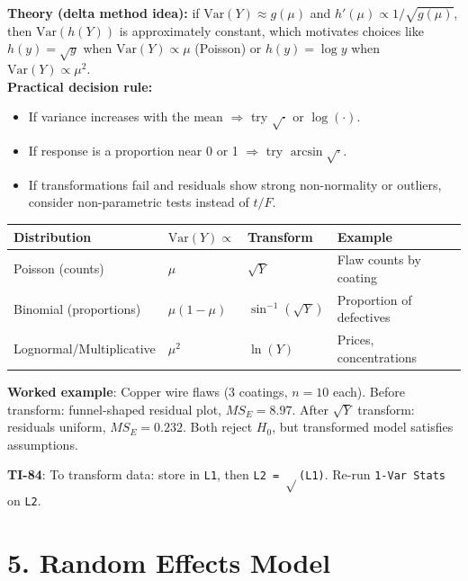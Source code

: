 \documentclass[9pt,letterpaper]{article}
\begin{document}
\textbf{Theory (delta method idea):} if $\mathrm{Var}(Y)\approx g(\mu)$ and $h'(\mu)\propto 1/\sqrt{g(\mu)}$, then $\mathrm{Var}(h(Y))$ is approximately constant, which motivates choices like $h(y)=\sqrt{y}$ when $\mathrm{Var}(Y)\propto\mu$ (Poisson) or $h(y)=\log y$ when $\mathrm{Var}(Y)\propto\mu^2$.\\[2pt]
\textbf{Practical decision rule:}
\begin{itemize}
  \item If variance increases with the mean $\Rightarrow$ try $\sqrt{\cdot}$ or $\log(\cdot)$.
  \item If response is a proportion near 0 or 1 $\Rightarrow$ try $\arcsin\sqrt{\cdot}$.
  \item If transformations fail and residuals show strong non-normality or outliers, consider non-parametric tests instead of $t/F$.
\end{itemize}


\begin{center}\small
\begin{tabular}{@{}llll@{}}
\toprule
Distribution & $\text{Var}(Y) \propto$ & Transform & Example \\
\midrule
Poisson (counts) & $\mu$ & $\sqrt{Y}$ & Flaw counts by coating \\
Binomial (proportions) & $\mu(1-\mu)$ & $\sin^{-1}(\sqrt{Y})$ & Proportion of defectives \\
Lognormal/Multiplicative & $\mu^2$ & $\ln(Y)$ & Prices, concentrations \\
\bottomrule
\end{tabular}
\end{center}

\textbf{Worked example}: Copper wire flaws (3 coatings, $n=10$ each). Before transform: funnel-shaped residual plot, $MS_E = 8.97$. After $\sqrt{Y}$ transform: residuals uniform, $MS_E = 0.232$. Both reject $H_0$, but transformed model satisfies assumptions.

\begin{calcbox}
\textbf{TI-84}: To transform data: store in \texttt{L1}, then \texttt{L2 = $\sqrt{}$(L1)}. Re-run \texttt{1-Var Stats} on \texttt{L2}.
\end{calcbox}

\section{5. Random Effects Model}
\end{document}
